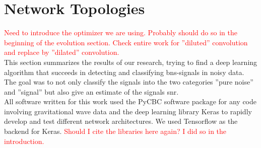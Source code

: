 \section{Network Topologies}\label{sec:network_topologies}
\textcolor{red}{Need to introduce the optimizer we are using. Probably should do so in the beginning of the evolution section. Check entire work for ''diluted'' convolution and replace by ''dilated'' convolution.}\\
This section summarizes the results of our research, trying to find a deep learning algorithm that succeeds in detecting and classifying \gls{bns}-signals in noisy data. The goal was to not only classify the signals into the two categories ''pure noise'' and ''signal'' but also give an estimate of the signals \gls{snr}.\\
All software written for this work used the PyCBC software package \cite{pycbc} for any code involving gravitational wave data and the deep learning library Keras \cite{keras} to rapidly develop and test different network architectures. We used Tensorflow \cite{tensorflow} as the backend for Keras. \textcolor{red}{Should I cite the libraries here again? I did so in the introduction.}


